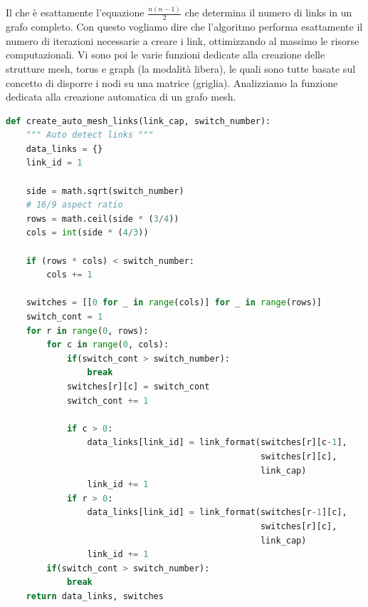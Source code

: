 \documentclass[binding=0.6cm]{sapthesis}
\begin{document}
Il che è esattamente l'equazione \(\frac{n(n-1)}{2}\) che determina il numero di links in un grafo completo. Con questo vogliamo dire che 
l'algoritmo performa esattamente il numero di iterazioni necessarie a creare i link, ottimizzando al massimo le risorse computazionali.
Vi sono poi le varie funzioni dedicate alla creazione delle strutture mesh, torus e graph (la modalità libera), le quali sono tutte basate sul concetto di
disporre i nodi su una matrice (griglia).
Analizziamo la funzione dedicata alla creazione automatica di un grafo mesh.

{\scriptsize %
\begin{lstlisting}[language=Python, basicstyle=\ttfamily, caption={Funzione per la creazione automatica di un grafo mesh}, label={codice:create_auto_mesh_links}]
    def create_auto_mesh_links(link_cap, switch_number):
    """ Auto detect links """
    data_links = {}
    link_id = 1

    side = math.sqrt(switch_number)
    # 16/9 aspect ratio
    rows = math.ceil(side * (3/4))
    cols = int(side * (4/3))

    if (rows * cols) < switch_number:
        cols += 1

    switches = [[0 for _ in range(cols)] for _ in range(rows)]
    switch_cont = 1
    for r in range(0, rows):
        for c in range(0, cols):
            if(switch_cont > switch_number):
                break
            switches[r][c] = switch_cont
            switch_cont += 1

            if c > 0:
                data_links[link_id] = link_format(switches[r][c-1], 
                                                  switches[r][c], 
                                                  link_cap)
                link_id += 1
            if r > 0:
                data_links[link_id] = link_format(switches[r-1][c], 
                                                  switches[r][c], 
                                                  link_cap)
                link_id += 1
        if(switch_cont > switch_number):
            break
    return data_links, switches
\end{lstlisting}
} %
\end{document}
